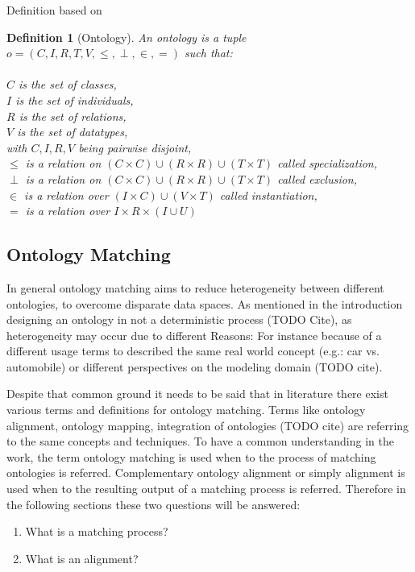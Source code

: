 \documentclass[11pt,titlepage,oneside,openany,a4paper]{report}
\newtheorem{definition}{Definition}[chapter]
\begin{document}
Definition based on \cite{euzenat2013d}

\begin{definition} [Ontology] An ontology is a tuple $ o = ( C,I,R,T,V,\leq,\perp,\in,=)$ such that:\\ \\
$C$ is the set of classes,\\
$I$ is the set of individuals,\\
$R$ is the set of relations,\\
$V$ is the set of datatypes,\\
with $C,I,R,V$ being pairwise disjoint, \\
$\leq$ is a relation on  $ (C \times C)  \cup (R \times R) \cup (T \times T)$  called specialization,\\
$\perp$ is a relation on  $ (C \times C)  \cup (R \times R) \cup (T \times T)$ called exclusion,\\
$\in$ is a relation over $(I \times C) \cup (V \times T)$ called instantiation,\\
$=$ is a relation over $ I \times R \times (I \cup U)$
\end{definition}
\subsection{Ontology Matching}
\label{sec:ontologymatching_def}
In general ontology matching aims to reduce heterogeneity between different ontologies, to overcome disparate data spaces. As mentioned in the introduction designing an ontology in not a deterministic process (TODO Cite), as heterogeneity may occur due to different Reasons: For instance because of a different usage terms  to described the same real world concept (e.g.: car vs. automobile)  or different perspectives on the modeling domain (TODO cite). 

	Despite that common ground it needs to be said that in literature there exist various terms and definitions for ontology matching. Terms like ontology alignment, ontology mapping, integration of ontologies (TODO cite) are referring to the same concepts and techniques. To have a common understanding in the work, the term ontology matching is used when to the process of matching ontologies is referred. Complementary ontology alignment or simply alignment is used when to the resulting output of a matching process is referred. Therefore in the following sections these two questions will be answered:
	
\begin{enumerate}
\item What is a matching process?
\item What is an alignment?
\end{enumerate}
\end{document}
